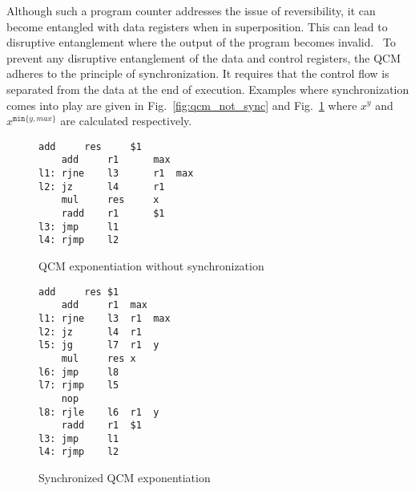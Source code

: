 Although such a program counter addresses the issue of reversibility, it can become entangled with data registers when in superposition. This can lead to disruptive entanglement where the output of the program becomes invalid.~\cite{YVC24} To prevent any disruptive entanglement of the data and control registers, the QCM adheres to the principle of synchronization. It requires that the control flow is separated from the data at the end of execution. 
Examples where synchronization comes into play are given in Fig.~\ref{fig:qcm_not_sync} and Fig.~\ref{fig:qcm_sync} where $x^y$ and $x^{\texttt{min}\{y, max\}}$ are calculated respectively. 

\begin{figure}
    \centering     
    \begin{minipage}{.45\textwidth}
        \vspace{5em}
        \begin{lstlisting}[linewidth=21em,style=QCM]
    add     res     $1
    add     r1      max
l1: rjne    l3      r1  max
l2: jz      l4      r1
    mul     res     x
    radd    r1      $1
l3: jmp     l1  
l4: rjmp    l2      
        \end{lstlisting}
        \caption{QCM exponentiation without synchronization}
        \label{fig:qcm_not_sync}
    \end{minipage}
    \hfill
    \begin{minipage}{.45\textwidth}
        \begin{lstlisting}[linewidth=21em,style=QCM]
    add     res $1
    add     r1  max
l1: rjne    l3  r1  max
l2: jz      l4  r1
l5: jg      l7  r1  y   
    mul     res x
l6: jmp     l8  
l7: rjmp    l5
    nop
l8: rjle    l6  r1  y
    radd    r1  $1
l3: jmp     l1
l4: rjmp    l2
        \end{lstlisting}
        \caption{Synchronized QCM exponentiation}    
        \label{fig:qcm_sync}
    \end{minipage}
\end{figure}



